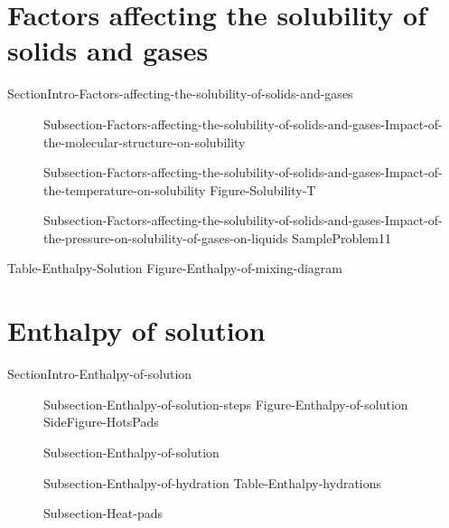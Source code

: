 \documentclass[main.tex]{subfiles}
\newcommand\chapterlabel{Ch-solutions}\setcounter{figurenewcounter}{0}\setcounter{tablenewcounter}{0}\setcounter{formulanewcounter}{0}\chapterpicture{../{\chapterlabel}/figure1}\chapterpicturelabel{PxFuel}
\begin{document}
\section{Factors affecting the solubility of solids and gases}{SectionIntro-Factors-affecting-the-solubility-of-solids-and-gases}
\sloppy \begin{description}
\item[] {Subsection-Factors-affecting-the-solubility-of-solids-and-gases-Impact-of-the-molecular-structure-on-solubility}
\item[] {Subsection-Factors-affecting-the-solubility-of-solids-and-gases-Impact-of-the-temperature-on-solubility}
{Figure-Solubility-T}
\item[] {Subsection-Factors-affecting-the-solubility-of-solids-and-gases-Impact-of-the-pressure-on-solubility-of-gases-on-liquids}
{SampleProblem11}
\end{description}




{Table-Enthalpy-Solution}
{Figure-Enthalpy-of-mixing-diagram }
\section{Enthalpy of solution}{SectionIntro-Enthalpy-of-solution}
\sloppy \begin{description}
\item[] {Subsection-Enthalpy-of-solution-steps}
{Figure-Enthalpy-of-solution}
{SideFigure-HotsPads}

\item[] {Subsection-Enthalpy-of-solution}
\item[] {Subsection-Enthalpy-of-hydration}
{Table-Enthalpy-hydrations}
\item[] {Subsection-Heat-pads}
\end{description}


\checkoddpage\ifoddpage \clearpage\thispagestyle{empty}\mbox{}\clearpage \else  \fi 
\end{document}
